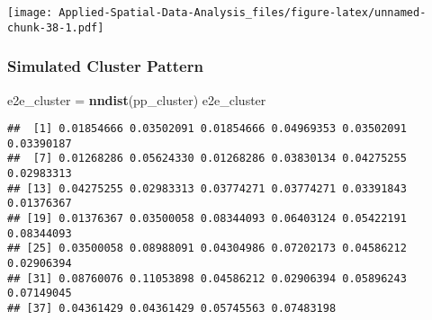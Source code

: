 \documentclass[
]{book}
\newenvironment{Shaded}{\begin{snugshade}}{\end{snugshade}}
\newcommand{\CommentTok}[1]{\textcolor[rgb]{0.56,0.35,0.01}{\textit{#1}}}
\newcommand{\ControlFlowTok}[1]{\textcolor[rgb]{0.13,0.29,0.53}{\textbf{#1}}}
\newcommand{\DataTypeTok}[1]{\textcolor[rgb]{0.13,0.29,0.53}{#1}}
\newcommand{\DecValTok}[1]{\textcolor[rgb]{0.00,0.00,0.81}{#1}}
\newcommand{\KeywordTok}[1]{\textcolor[rgb]{0.13,0.29,0.53}{\textbf{#1}}}
\newcommand{\NormalTok}[1]{#1}
\newcommand{\OperatorTok}[1]{\textcolor[rgb]{0.81,0.36,0.00}{\textbf{#1}}}
\newcommand{\StringTok}[1]{\textcolor[rgb]{0.31,0.60,0.02}{#1}}
\begin{document}
\begin{Shaded}
\end{Shaded}

\texttt{[image: Applied-Spatial-Data-Analysis\_files/figure-latex/unnamed-chunk-38-1.pdf]}

\hypertarget{simulated-cluster-pattern-1}{%
\subsubsection{Simulated Cluster Pattern}\label{simulated-cluster-pattern-1}}

\begin{Shaded}
\begin{Highlighting}[]
\NormalTok{e2e_cluster =}\StringTok{ }\KeywordTok{nndist}\NormalTok{(pp_cluster)}
\NormalTok{e2e_cluster}
\end{Highlighting}
\end{Shaded}

\begin{verbatim}
##  [1] 0.01854666 0.03502091 0.01854666 0.04969353 0.03502091 0.03390187
##  [7] 0.01268286 0.05624330 0.01268286 0.03830134 0.04275255 0.02983313
## [13] 0.04275255 0.02983313 0.03774271 0.03774271 0.03391843 0.01376367
## [19] 0.01376367 0.03500058 0.08344093 0.06403124 0.05422191 0.08344093
## [25] 0.03500058 0.08988091 0.04304986 0.07202173 0.04586212 0.02906394
## [31] 0.08760076 0.11053898 0.04586212 0.02906394 0.05896243 0.07149045
## [37] 0.04361429 0.04361429 0.05745563 0.07483198
\end{verbatim}
\end{document}
